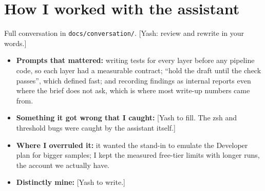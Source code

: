 \documentclass[10pt]{article}
\begin{document}
\section*{How I worked with the assistant}

Full conversation in \texttt{docs/conversation/}. [Yash: review and rewrite in your words.]

\begin{itemize}[leftmargin=*,nosep]
\item \textbf{Prompts that mattered:} writing tests for every layer before any pipeline code, so each layer had a measurable contract; ``hold the draft until the check passes'', which defined fast; and recording findings as internal reports even where the brief does not ask, which is where most write-up numbers came from.
\item \textbf{Something it got wrong that I caught:} [Yash to fill. The zsh and threshold bugs were caught by the assistant itself.]
\item \textbf{Where I overruled it:} it wanted the stand-in to emulate the Developer plan for bigger samples; I kept the measured free-tier limits with longer runs, the account we actually have.
\item \textbf{Distinctly mine:} [Yash to write.]
\end{itemize}
\end{document}
